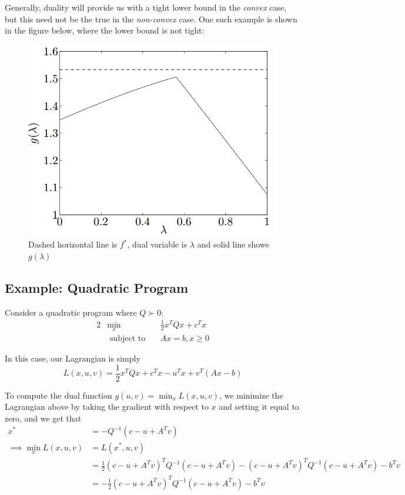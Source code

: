\documentclass[11pt]{article}
\begin{document}
Generally, duality will provide us with a tight lower bound in the
\textit{convex} case, but this need not be the true in the \textit{non-convex} case. One such example is shown in the figure below, where the lower bound is not tight:
\begin{figure}[h]
  \centering
  \includegraphics[scale=0.3]{tightness.png}
  \caption{Dashed horizontal line is $f^*$, dual variable is $\lambda$ and solid line shows $g(\lambda)$}
  \label{fig:tightness}
\end{figure}

\subsection{Example: Quadratic Program}
Consider a quadratic program where $Q \succ 0$:
\begin{alignat*}{2}
&\min_x& &\frac{1}{2} x^T Q x + c^T x \\
&\text{ subject to}&~&Ax = b, x \geq 0
\end{alignat*}

In this case, our Lagrangian is simply
\[ L(x, u, v) = \frac{1}{2} x^T Q x + c^T x - u^T x + v^T(Ax - b) \]

To compute the dual function $g(u, v) = \min_x L(x, u, v)$, we minimize the
Lagrangian above by taking the gradient with respect to $x$ and setting it equal
to zero, and we get that
\begin{align*}
x^* &= -Q^{-1}(c - u + A^T v) \\
\implies \min_x L(x, u, v) &= L(x^*, u, v) \\
    &= \frac{1}{2} (c - u + A^T v)^T Q^{-1}(c - u + A^T v) - (c - u + A^T v)^T Q^{-1}(c - u + A^T v) - b^T v \\
    &= -\frac{1}{2} (c - u + A^T v)^T Q^{-1}(c - u + A^T v) - b^T v
\end{align*}
\end{document}
